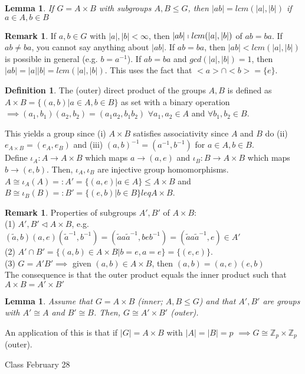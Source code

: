 \documentclass[11pt]{article}
\newtheorem{lem}[thm]{Lemma}
\theoremstyle{definition}
\newtheorem{definition}[thm]{Definition}
\newtheorem{rem}[thm]{Remark}
\numberwithin{equation}{section}
\newcommand{\Z}{\mathbb{Z}}
\begin{document}
\begin{lem}
If $G = A \times B$ with subgroups $A, B \leq G$, then $|ab| = lcm(|a|, |b|)$ if $a \in A, b\in B$
\end{lem}
\begin{rem}
If $a, b \in G$ with $|a|, |b| < \infty$, then $|ab| \shortmid lcm(|a|, |b|)$ of $ab = ba$. If $ab \neq ba$, you cannot say anything about $|ab|$. If $ab = ba$, then $|ab| < lcm(|a|, |b|)$ is possible in general (e.g. $b = a^{-1}$). If $ab = ba$ and $gcd(|a|, |b|) = 1$, then $|ab| = |a||b| = lcm(|a|, |b|)$. This uses the fact that $<a> \cap <b> = \{e\}$.
\end{rem}
\begin{definition}
The (outer) direct product of the groups $A, B$ is defined as $A \times B = \{(a,b) | a \in A, b \in B\}$ as set with a binary operation $\implies (a_1, b_1)(a_2, b_2) = (a_{1}a_{2}, b_{1}b_{2})$ $\forall a_{1}, a_{2} \in A$ and $\forall b_{1}, b_{2} \in B$.
\end{definition}
This yields a group since (i) $A \times B$ satisfies associativity since $A$ and $B$ do (ii) $e_{A \times B} = (e_A, e_B)$ and (iii) $(a, b)^{-1} = (a^{-1}, b^{-1})$ for $a \in A, b \in B$. \\
Define $\iota_A : A \rightarrow A \times B$ which maps $a \rightarrow (a, e)$ and $\iota_B : B \rightarrow A \times B$ which maps $b \rightarrow (e, b)$. Then, $\iota_A, \iota_B$ are injective group homomorphisms.\\
$A \cong \iota_{A}(A) =: A' = \{(a, e) | a \in A\} \leq A \times B$ and $B \cong \iota_{B}(B) =: B' = \{(e, b) | b \in B\} leq A \times B$.\\
\begin{rem}
Properties of subgroups $A', B'$ of $A \times B$:\\
(1) $A', B' \vartriangleleft A \times B$, e.g. $(\widetilde{a}, b)(a, e)(\widetilde{a}^{-1}, b^{-1}) = (\widetilde{a}a\widetilde{a}^{-1}, beb^{-1}) = (\widetilde{a}a\widetilde{a}^{-1}, e) \in A'$\\
(2) $A' \cap B' = \{(a, b) \in A \times B | b = e, a = e \} = \{(e, e)\}$.\\
(3) $G = A'B' \implies$ given $(a, b) \in A \times B$, then $(a, b) = (a, e)(e, b)$\\
The consequence is that the outer product equals the inner product such that $A \times B = A' \times B'$
\end{rem}
\begin{lem}
Assume that $G = A \times B$ (inner; $A, B \leq G$) and that $A', B'$ are groups with $A' \cong A$ and $B' \cong B$. Then, $G \cong A' \times B'$ (outer).
\end{lem}
An application of this is that if $|G| = A \times B$ with $|A| = |B| = p$ $\implies G \cong \Z_p \times \Z_p$ (outer).

\begin{center}
{\sf\LARGE Class February 28}
\end{center}
\end{document}
